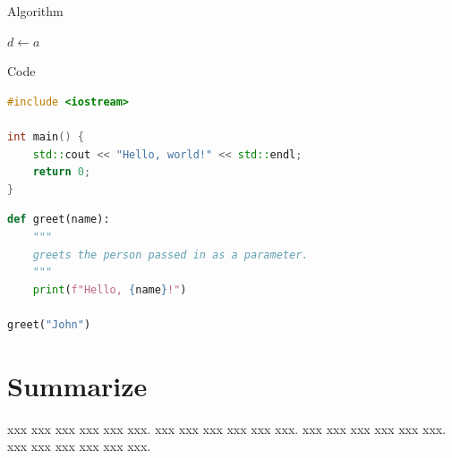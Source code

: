\documentclass[compress,aspectratio=43]{beamer}
\begin{document}
\begin{frame}{Algorithm}
    \begin{algorithm}[H]
        \caption{Euclid's algorithm}
        $d \leftarrow a$\;
    \end{algorithm}

\end{frame}

\begin{frame}[fragile]{Code}

    \begin{lstlisting}[language=c++]
#include <iostream>

int main() {
    std::cout << "Hello, world!" << std::endl;
    return 0;
}
\end{lstlisting}

    \begin{lstlisting}[language=python]
def greet(name):
    """
    greets the person passed in as a parameter.
    """
    print(f"Hello, {name}!")

greet("John")
\end{lstlisting}

\end{frame}


\section{Summarize}

\begin{frame}
    xxx xxx xxx xxx xxx xxx.
    xxx xxx xxx xxx xxx xxx.
    xxx xxx xxx xxx xxx xxx.
    xxx xxx xxx xxx xxx xxx.
\end{frame}
\end{document}
